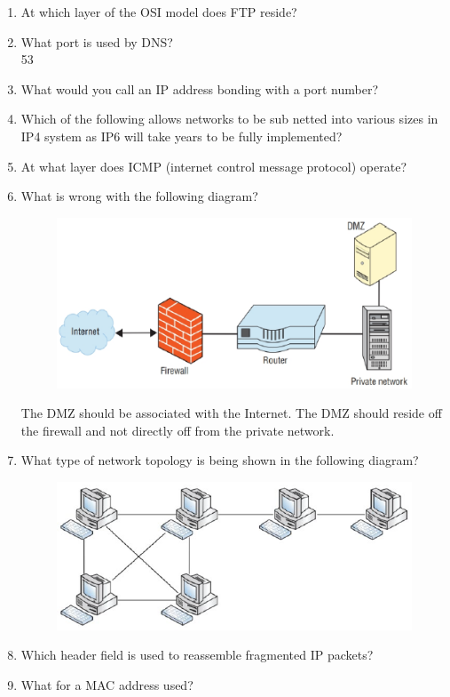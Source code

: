 \begin{enumerate}
    \item At which layer of the OSI model does FTP reside?
    \item What port is used by DNS?\\53
    \item What would you call an IP address bonding with a port number?
    \item Which of the following allows networks to be sub netted into various sizes in IP4 system as IP6 will take years to be fully implemented?
    \item At what layer does ICMP (internet control message protocol) operate?
    \item What is wrong with the following diagram?
    \begin{figure}[H]
        \centering
        \includegraphics[width=\linewidth]{fig1.png}
    \end{figure}
    The DMZ should be associated with the Internet. The DMZ should reside off the firewall and not directly off from the private network.
    \item What type of network topology is being shown in the following diagram?
    \begin{figure}[H]
        \centering
        \includegraphics[width=\linewidth]{fig2.png}
    \end{figure}
    \item Which header field is used to reassemble fragmented IP packets?
    \item What for a MAC address used?
\end{enumerate}

